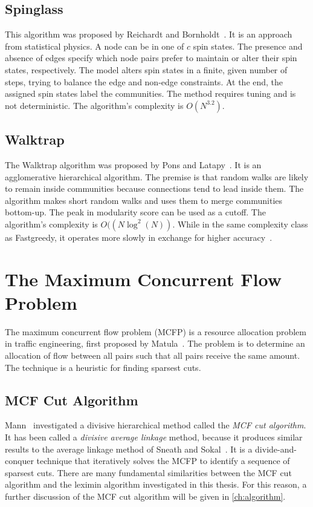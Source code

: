 \subsection{Spinglass}

This algorithm was proposed by Reichardt and Bornholdt~\cite{reichardt2006statistical}. It is an approach from statistical physics. A node can be in one of $c$ spin states. The presence and absence of edges specify which node pairs prefer to maintain or alter their spin states, respectively. The model alters spin states in a finite, given number of steps, trying to balance the edge and non-edge constraints. At the end, the assigned spin states label the communities. The method requires tuning and is not deterministic. The algorithm's complexity is $O(N^{3.2})$.

\subsection{Walktrap}

The Walktrap algorithm was proposed by Pons and Latapy~\cite{pons2005computing}. It is an agglomerative hierarchical algorithm. The premise is that random walks are likely to remain inside communities because connections tend to lead inside them. The algorithm makes short random walks and uses them to merge communities bottom-up. The peak in modularity score can be used as a cutoff. The algorithm's complexity is $O((N \log^2(N))$. While in the same complexity class as Fastgreedy, it operates more slowly in exchange for higher accuracy~\cite{pons2005computing, yang2016comparative}.

\section{The Maximum Concurrent Flow Problem}

The maximum concurrent flow problem (MCFP) is a resource allocation problem in traffic engineering, first proposed by Matula~\cite{matula1985concurrent, shahrokhi1990maximum}. The problem is to determine an allocation of flow between all pairs such that all pairs receive the same amount. The technique is a heuristic for finding sparsest cuts.

\subsection{MCF Cut Algorithm}

Mann~\cite{mann2008sparsest} investigated a divisive hierarchical method called the \emph{MCF cut algorithm}. It has been called a \emph{divisive average linkage} method, because it produces similar results to the average linkage method of Sneath and Sokal~\cite{sneath1962numerical}. It is a divide-and-conquer technique that iteratively solves the MCFP to identify a sequence of sparsest cuts. There are many fundamental similarities between the MCF cut algorithm and the leximin algorithm investigated in this thesis. For this reason, a further discussion of the MCF cut algorithm will be given in \autoref{ch:algorithm}.
